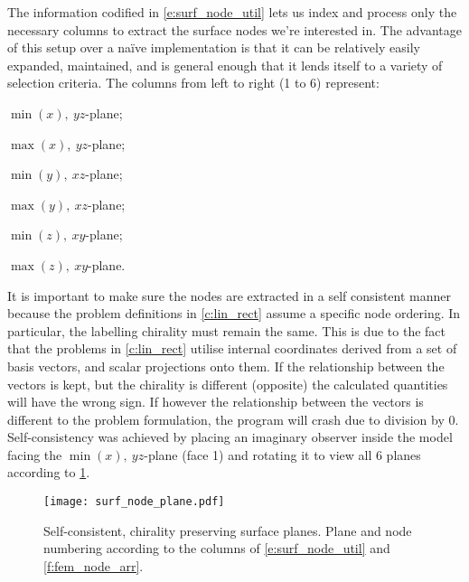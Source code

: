 The information codified in \cref{e:surf_node_util} lets us index and process only the necessary columns to extract the surface nodes we're interested in. The advantage of this setup over a naïve implementation is that it can be relatively easily expanded, maintained, and is general enough that it lends itself to a variety of selection criteria. The columns from left to right (1 to 6) represent:
\begin{inparaenum}
	\item $ \min(x),~ yz $-plane;
	\item $ \max(x),~ yz $-plane;
	\item $ \min(y),~ xz $-plane;
	\item $ \max(y),~ xz $-plane;
	\item $ \min(z),~ xy $-plane;
	\item $ \max(z),~ xy $-plane.
\end{inparaenum}

It is important to make sure the nodes are extracted in a self consistent manner because the problem definitions in \cref{c:lin_rect} assume a specific node ordering. In particular, the labelling chirality must remain the same. This is due to the fact that the problems in \cref{c:lin_rect} utilise internal coordinates derived from a set of basis vectors, and scalar projections onto them. If the relationship between the vectors is kept, but the chirality is different (opposite) the calculated quantities will have the wrong sign. If however the relationship between the vectors is different to the problem formulation, the program will crash due to division by 0. Self-consistency was achieved by placing an imaginary observer inside the  model facing the $ \min(x),~ yz $-plane (face 1) and rotating it to view all 6 planes according to \cref{f:surf_node_plane}.
\begin{figure}
	\centering
	\texttt{[image: surf\_node\_plane.pdf]}
	\caption[Self-consistent, chirality preserving surface planes.]{Self-consistent, chirality preserving surface planes. Plane and node numbering according to the columns of \cref{e:surf_node_util} and \cref{f:fem_node_arr}.}
	\label{f:surf_node_plane}
\end{figure}
